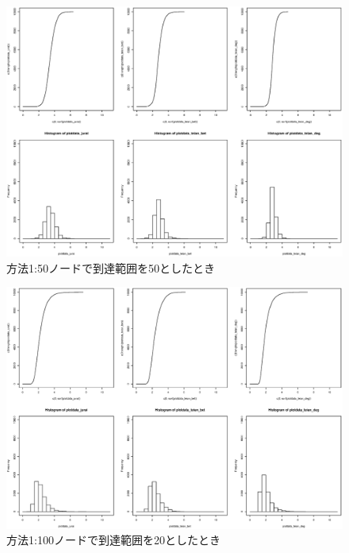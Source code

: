 \begin{landscape}
\begin{figure}[H]
  \centering
  \includegraphics[width=1.2\textwidth]{figures/1_50_50.eps}
  \caption{方法1:50ノードで到達範囲を50としたとき}
  \label{fig:plot}
\end{figure}

\begin{figure}[H]
  \centering
  \includegraphics[width=1.2\textwidth]{figures/1_100_20.eps}
  \caption{方法1:100ノードで到達範囲を20としたとき}
  \label{fig:plot}
\end{figure}



\end{landscape}

